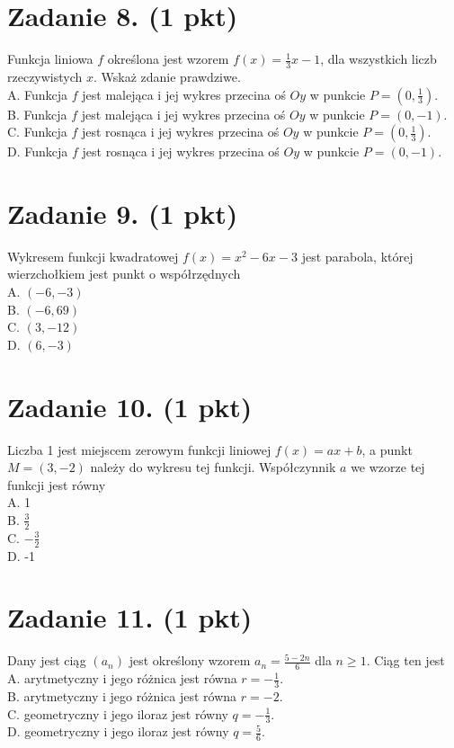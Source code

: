 \documentclass[10pt]{article}
\begin{document}
\section*{Zadanie 8. (1 pkt)}
Funkcja liniowa \(f\) określona jest wzorem \(f(x)=\frac{1}{3} x-1\), dla wszystkich liczb rzeczywistych \(x\). Wskaż zdanie prawdziwe.\\
A. Funkcja \(f\) jest malejąca i jej wykres przecina oś \(O y\) w punkcie \(P=\left(0, \frac{1}{3}\right)\).\\
B. Funkcja \(f\) jest malejąca i jej wykres przecina oś \(O y\) w punkcie \(P=(0,-1)\).\\
C. Funkcja \(f\) jest rosnąca i jej wykres przecina oś \(O y\) w punkcie \(P=\left(0, \frac{1}{3}\right)\).\\
D. Funkcja \(f\) jest rosnąca i jej wykres przecina oś \(O y\) w punkcie \(P=(0,-1)\).

\section*{Zadanie 9. (1 pkt)}
Wykresem funkcji kwadratowej \(f(x)=x^{2}-6 x-3\) jest parabola, której wierzchołkiem jest punkt o współrzędnych\\
A. \((-6,-3)\)\\
B. \((-6,69)\)\\
C. \((3,-12)\)\\
D. \((6,-3)\)

\section*{Zadanie 10. (1 pkt)}
Liczba 1 jest miejscem zerowym funkcji liniowej \(f(x)=a x+b\), a punkt \(M=(3,-2)\) należy do wykresu tej funkcji. Współczynnik \(a\) we wzorze tej funkcji jest równy\\
A. 1\\
B. \(\frac{3}{2}\)\\
C. \(-\frac{3}{2}\)\\
D. -1

\section*{Zadanie 11. (1 pkt)}
Dany jest ciąg \(\left(a_{n}\right)\) jest określony wzorem \(a_{n}=\frac{5-2 n}{6}\) dla \(n \geq 1\). Ciąg ten jest\\
A. arytmetyczny i jego różnica jest równa \(r=-\frac{1}{3}\).\\
B. arytmetyczny i jego różnica jest równa \(r=-2\).\\
C. geometryczny i jego iloraz jest równy \(q=-\frac{1}{3}\).\\
D. geometryczny i jego iloraz jest równy \(q=\frac{5}{6}\).
\end{document}
